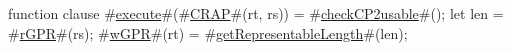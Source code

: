 function clause #\hyperref[zexecute]{execute}#(#\hyperref[zCRAP]{CRAP}#(rt, rs)) =
{
  #\hyperref[zcheckCP2usable]{checkCP2usable}#();
  let len = #\hyperref[zrGPR]{rGPR}#(rs);
  #\hyperref[zwGPR]{wGPR}#(rt) = #\hyperref[zgetRepresentableLength]{getRepresentableLength}#(len);
}

